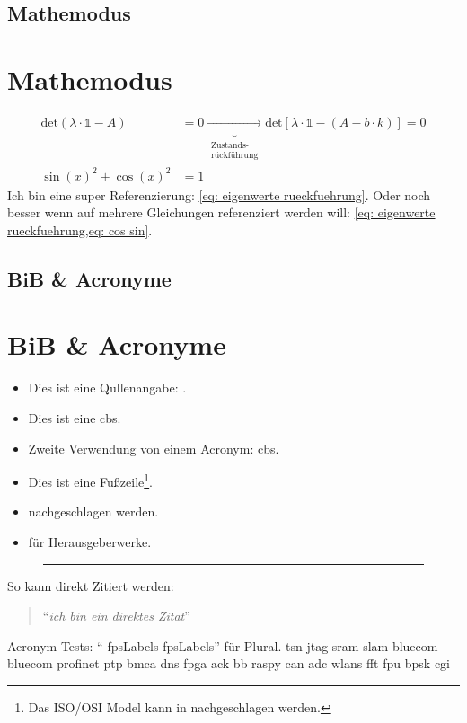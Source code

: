 \documentclass[./\jobname.tex]{subfiles}
\begin{document}
%
\blindmathtrue
\blinddocument
%
\if\paper\FHVmode
	\section{Mathemodus}
\else
	\chapter{Mathemodus}
\fi
%
\begin{align}
\text{det}(\lambda \cdot \mathds{1} -A) &= 0 \underbrace{\longrightarrow}_{\substack{\text{Zustands-} \\ \text{rückführung}}} \text{det}\left[\lambda\cdot \mathds{1} - \left(A-b\cdot k\right)\right]=0\label{eq: eigenwerte rueckfuehrung}\\
\sin(x)^{2} + \cos(x)^{2} &= 1\label{eq: cos sin}
\end{align}
%
Ich bin eine super Referenzierung: \cref{eq: eigenwerte rueckfuehrung}. Oder noch besser wenn auf mehrere Gleichungen referenziert werden will: \cref{eq: eigenwerte rueckfuehrung,eq: cos sin}.
%
\if\paper\FHVmode
	\section{BiB \& Acronyme}
\else
	\chapter{BiB \& Acronyme}
\fi
%
\begin{itemize}
	\item Dies ist eine Qullenangabe: \parencite[Vgl.][S.220-224]{IEEE802.1Q2014}.
	\item Dies ist eine \gls{cbs}.
	\item Zweite Verwendung von einem Acronym: \gls{cbs}.
	\item Dies ist eine Fußzeile\footnote{Das ISO/OSI Model kann in \cite[][S.2-9]{Mandl2010} nachgeschlagen werden.}.
	\item \textcite[][S.2-9]{Mandl2010} nachgeschlagen werden.
	\item \parencite{Gibb1965Light} für Herausgeberwerke.
\end{itemize}
%
\begin{figure}
	\centering
	\rule{1cm}{1cm}
\end{figure}
%
So kann direkt Zitiert werden:
%
\begin{quote}
	\enquote{\textit{ich bin ein direktes Zitat}} \cite{Broster2001}
\end{quote}
%
Acronym Tests: \enquote{ \glspl{fpsLabel} \glspl{fpsLabel}} für Plural.
%
\newpage
%
\gls{tsn} \gls{jtag} \gls{sram} \gls{slam} \gls{bluecom} \gls{bluecom} \gls{profinet} \gls{ptp} \gls{bmca} \gls{dns} \gls{fpga} \gls{ack} \gls{bb} \gls{raspy} \gls{can} \gls{adc} \glspl{wlan} \gls{fft} \gls{fpu} \gls{bpsk} \gls{cgi}\par
%
\blindtext[1]
%
\if\paper\FHVmode
\end{document}
